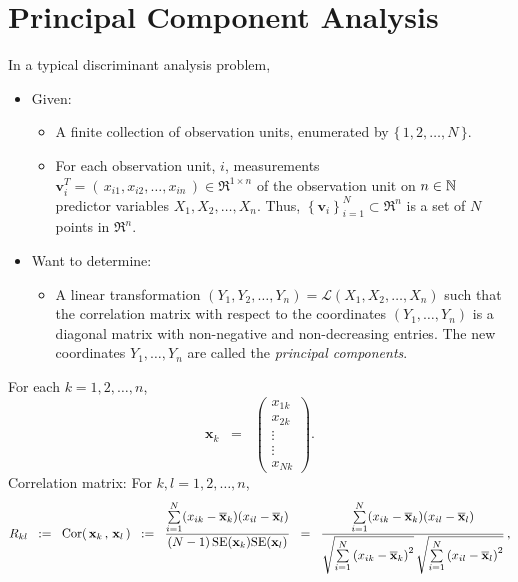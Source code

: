 \documentclass{article}
\begin{document}

\section{Principal Component Analysis}
\setcounter{theorem}{0}

In a typical discriminant analysis problem,
\begin{itemize}
\item  Given:
           \begin{itemize}
               \item  A finite collection of observation units, enumerated by $\{\,1,2,\ldots,N\,\}$.
               \item  For each observation unit, $i$, measurements
                         $\mathbf{v}^{T}_{i} = \left(\,x_{i1},x_{i2},\ldots,x_{in}\,\right) \in \Re^{1 \times n}$
                         of the observation unit on $n\in\mathbb{N}$ predictor variables $X_{1},X_{2},\ldots,X_{n}$.
                         Thus, $\left\{\mathbf{v}_{i}\right\}^{N}_{i=1} \subset \Re^{n}$ is a set of
                         $N$ points in $\Re^{n}$.
           \end{itemize}
\item  Want to determine:
          \begin{itemize}
          \item  A linear transformation $\left(Y_{1},Y_{2},\ldots,Y_{n}\right) = \mathcal{L}\!\left(X_{1},X_{2},\ldots,X_{n}\right)$
                    such that the correlation matrix with respect to the coordinates $(Y_{1},\ldots,Y_{n})$ is a
                    diagonal matrix with non-negative and non-decreasing entries.  The new coordinates $Y_{1},\ldots,Y_{n}$
                    are called the \emph{principal components}.
          \end{itemize}
\end{itemize}
For each $k = 1, 2, \ldots, n$,
\begin{equation*}
\mathbf{x}_{k}
\;\; = \;\;
\left(\!\begin{array}{c}
x_{1k} \\ x_{2k} \\ \vdots \\ \vdots \\ x_{Nk}
\end{array}\!\right).
\end{equation*}
Correlation matrix:  For $k, l = 1, 2, \ldots, n$,
\begin{equation*}
R_{kl}
\;\; := \;\;
\textnormal{Cor}\!\left(\,\mathbf{x}_{k}\,,\,\mathbf{x}_{l}\,\right)
\;\; := \;\;
\dfrac{\underset{i=1}{\overset{N}{\sum}}(x_{ik}-\overline{\mathbf{x}}_{k})(x_{il}-\overline{\mathbf{x}}_{l})}
{(N-1)\,\textnormal{SE}(\mathbf{x}_{k})\textnormal{SE}(\mathbf{x}_{l})}
\;\; = \;\;
\dfrac{\underset{i=1}{\overset{N}{\sum}}(x_{ik}-\overline{\mathbf{x}}_{k})(x_{il}-\overline{\mathbf{x}}_{l})}
{\sqrt{\underset{i=1}{\overset{N}{\sum}}\left(x_{ik} - \overline{\mathbf{x}}_{k}\right)^{2}}\,\sqrt{\underset{i=1}{\overset{N}{\sum}}\left(x_{il} - \overline{\mathbf{x}}_{l}\right)^{2}}}\,,
\end{equation*}
\end{document}
